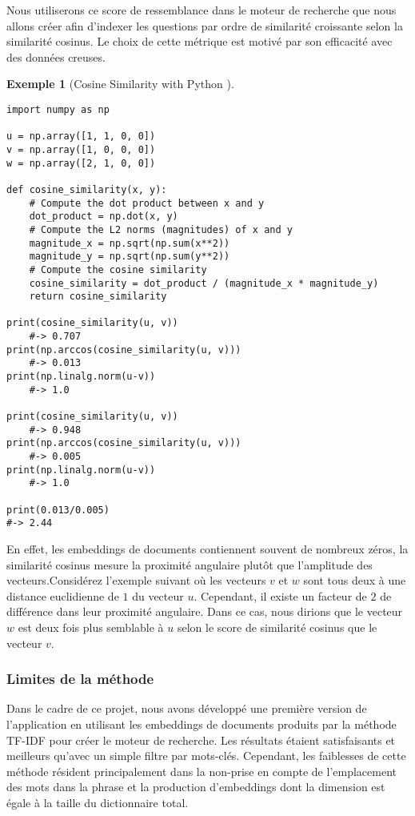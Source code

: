 \documentclass[12pt]{article}
\theoremstyle{definition}
\newtheorem{ex}{Exemple}
\begin{document}
Nous utiliserons ce score de ressemblance dans le moteur de recherche que nous allons créer afin d'indexer les questions par ordre de similarité croissante selon la similarité cosinus. Le choix de cette métrique est motivé par son efficacité avec des données creuses.\\

\begin{ex}[Cosine Similarity with Python \cite{CosineSimilarity}]\hfill\\
	
\begin{lstlisting}
import numpy as np

u = np.array([1, 1, 0, 0])
v = np.array([1, 0, 0, 0])
w = np.array([2, 1, 0, 0])

def cosine_similarity(x, y):
	# Compute the dot product between x and y
	dot_product = np.dot(x, y)
	# Compute the L2 norms (magnitudes) of x and y
	magnitude_x = np.sqrt(np.sum(x**2)) 
	magnitude_y = np.sqrt(np.sum(y**2))
	# Compute the cosine similarity
	cosine_similarity = dot_product / (magnitude_x * magnitude_y)
	return cosine_similarity

print(cosine_similarity(u, v))
	#-> 0.707
print(np.arccos(cosine_similarity(u, v)))
	#-> 0.013
print(np.linalg.norm(u-v))
	#-> 1.0

print(cosine_similarity(u, v))
	#-> 0.948
print(np.arccos(cosine_similarity(u, v)))
	#-> 0.005
print(np.linalg.norm(u-v))
	#-> 1.0

print(0.013/0.005)
#-> 2.44
\end{lstlisting}
	\newpage 
	En effet, les embeddings de documents contiennent souvent de nombreux zéros, la similarité cosinus mesure la proximité angulaire plutôt que l'amplitude des vecteurs.Considérez l'exemple suivant où les vecteurs $v$ et $w$ sont tous deux à une distance euclidienne de $1$ du vecteur $u$. Cependant, il existe un facteur de $2$ de différence dans leur proximité angulaire. Dans ce cas, nous dirions que le vecteur $w$ est deux fois plus semblable à $u$ selon le score de similarité cosinus que le vecteur $v$.
\end{ex}




\subsubsection{Limites de la méthode}
Dans le cadre de ce projet, nous avons développé une première version de l'application en utilisant les embeddings de documents produits par la méthode TF-IDF pour créer le moteur de recherche. Les résultats étaient satisfaisants et meilleurs qu'avec un simple filtre par mots-clés. Cependant, les faiblesses de cette méthode résident principalement dans la non-prise en compte de l'emplacement des mots dans la phrase et la production d'embeddings dont la dimension est égale à la taille du dictionnaire total. 
\end{document}
